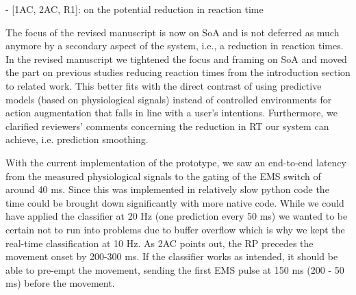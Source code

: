 
- [1AC, 2AC, R1]: on the potential reduction in reaction time

The focus of the revised manuscript is now on SoA and is not deferred as much anymore by a secondary aspect of the system, i.e., a reduction in reaction times. In the revised manuscript we tightened the focus and framing on SoA and moved the part on previous studies reducing reaction times from the introduction section to related work. This better fits with the direct contrast of using predictive models (based on physiological signals) instead of controlled environments for action augmentation that falls in line with a user's intentions. Furthermore, we clarified reviewers' comments concerning the reduction in RT our system can achieve, i.e. prediction smoothing.

With the current implementation of the prototype, we saw an end-to-end latency from the measured physiological signals to the gating of the EMS switch of around 40 ms. Since this was implemented in relatively slow python code the time could be brought down significantly with more native code. While we could have applied the classifier at 20 Hz (one prediction every 50 ms) we wanted to be certain not to run into problems due to buffer overflow which is why we kept the real-time classification at 10 Hz. As 2AC points out, the RP precedes the movement onset by 200-300 ms. If the classifier works as intended, it should be able to pre-empt the movement, sending the first EMS pulse at 150 ms (200 - 50 ms) before the movement. 

